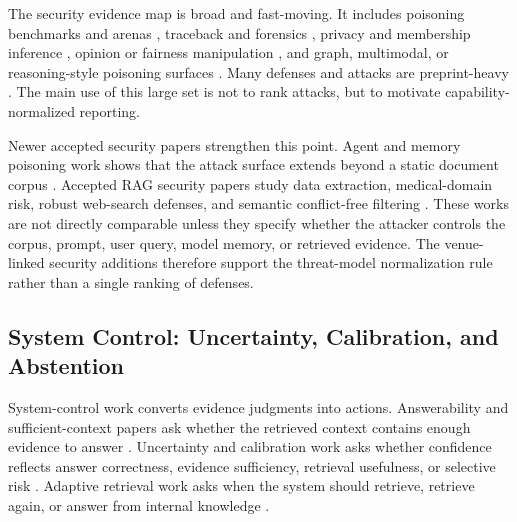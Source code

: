 \documentclass[11pt]{article}
\begin{document}
The security evidence map is broad and fast-moving. It includes poisoning benchmarks and arenas \citep{rrag019,rrag023,rrag033,rrag035}, traceback and forensics \citep{rrag014,rrag128}, privacy and membership inference \citep{rrag060,rrag063,rrag096,rrag103}, opinion or fairness manipulation \citep{rrag104,rrag162}, and graph, multimodal, or reasoning-style poisoning surfaces \citep{rrag051,rrag127,rrag175}. Many defenses and attacks are preprint-heavy \citep{rrag022,rrag025,rrag026,rrag047,rrag050,rrag052,rrag053,rrag054,rrag056,rrag059,rrag061,rrag062,rrag068,rrag070,rrag072,rrag078,rrag079,rrag080,rrag083,rrag084,rrag085,rrag090,rrag094,rrag097,rrag098,rrag099,rrag101,rrag102,rrag106,rrag107,rrag109,rrag114,rrag116,rrag117,rrag119,rrag120,rrag121,rrag122,rrag123,rrag124,rrag125,rrag126,rrag129,rrag133,rrag134,rrag137,rrag138,rrag139,rrag142,rrag144,rrag145,rrag148,rrag149,rrag155,rrag156,rrag157,rrag158,rrag160,rrag161,rrag165,rrag171,rrag172,rrag177,rrag185,rrag188,rrag189,rrag190,rrag194,rrag195,rrag196,rrag197,rrag199,rrag203,rrag208,rrag211,rrag213,rrag217,rrag221,rrag229}. The main use of this large set is not to rank attacks, but to motivate capability-normalized reporting.

Newer accepted security papers strengthen this point. Agent and memory poisoning work shows that the attack surface extends beyond a static document corpus \citep{rrag053}. Accepted RAG security papers study data extraction, medical-domain risk, robust web-search defenses, and semantic conflict-free filtering \citep{rrag090,rrag021,rrag017,venueAcc014}. These works are not directly comparable unless they specify whether the attacker controls the corpus, prompt, user query, model memory, or retrieved evidence. The venue-linked security additions therefore support the threat-model normalization rule rather than a single ranking of defenses.

\subsection{System Control: Uncertainty, Calibration, and Abstention}

System-control work converts evidence judgments into actions. Answerability and sufficient-context papers ask whether the retrieved context contains enough evidence to answer \citep{sufficientContext2024,rrag111,rrag141,rrag193}. Uncertainty and calibration work asks whether confidence reflects answer correctness, evidence sufficiency, retrieval usefulness, or selective risk \citep{calibRAG2025,uncertaintyRAG2024,rrag001,rrag007,rrag012,rrag093}. Adaptive retrieval work asks when the system should retrieve, retrieve again, or answer from internal knowledge \citep{selfRAG2023,whenToRetrieve2024,crag2024,ctrla2025,rrag034}.
\end{document}
